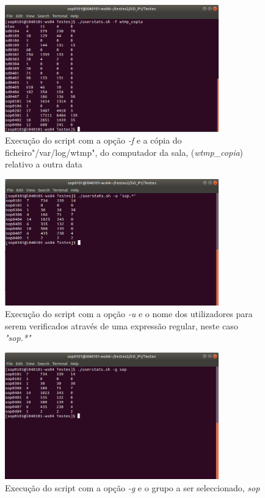 \documentclass[10pt,portuguese]{article}
\begin{document}
\begin{figure}[!h]
    \centering
    \includegraphics[width=350]{Resultados/user_f.jpeg}
    \caption{Execução do script com a opção \textit{-f} e a cópia do ficheiro"/var/log/wtmp", do computador da sala, (\textit{wtmp\_copia}) relativo a outra data }
\end{figure}

\begin{figure}[!h]
    \centering
    \includegraphics[width=350]{Resultados/user_u.jpeg}
    \caption{Execução do script com a opção \textit{-u} e o nome dos utilizadores para serem verificados através de uma expressão regular, neste caso \textit{"sop.*"}}
\end{figure}

\begin{figure}[!h]
    \centering
    \includegraphics[width=350]{Resultados/user_g.jpeg}
    \caption{Execução do script com a opção \textit{-g} e o grupo a ser seleccionado, \textit{sop}}
\end{figure}
\end{document}
